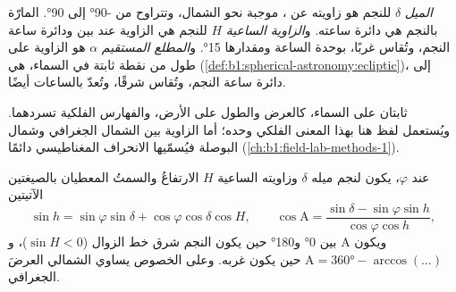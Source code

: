 \begin{definition}\label{def:b1:spherical-astronomy:equatorial}
\emph{الميل} $\delta$ للنجم هو زاويته عن ، موجبة نحو الشمال، وتتراوح من \ang{-90} إلى \ang{90}.  المارّة بالنجم  هي دائرة ساعته. و\emph{الزاوية الساعية} $H$ للنجم هي الزاوية عند  بين  ودائرة ساعة النجم، وتُقاس غربًا، بوحدة الساعة ومقدارها \ang{15}. و\emph{المطلع المستقيم} $\alpha$ هو الزاوية على طول  من نقطة ثابتة في السماء، هي  (\cref{def:b1:spherical-astronomy:ecliptic})، إلى دائرة ساعة النجم، وتُقاس شرقًا، وتُعدّ بالساعات أيضًا.
\end{definition}

 ثابتان على السماء، كالعرض والطول على الأرض، والفهارس الفلكية تسردهما. ويُستعمل لفظ  هنا بهذا المعنى الفلكي وحده؛ أما الزاوية بين الشمال الجغرافي وشمال البوصلة فيُسمّيها الانحراف المغناطيسي دائمًا (\cref{ch:b1:field-lab-methods-1}).

\begin{proposition}\label{prop:b1:spherical-astronomy:transform}
عند  $\varphi$، يكون لنجم ميله $\delta$ وزاويته الساعية $H$ الارتفاعُ والسمتُ المعطيان بالصيغتين الآتيتين
\[
  \sin h = \sin\varphi\sin\delta + \cos\varphi\cos\delta\cos H,
  \qquad
  \cos\mathrm{A} = \frac{\sin\delta - \sin\varphi\sin h}{\cos\varphi\cos h},
\]
ويكون $\mathrm{A}$ بين \ang{0} و\ang{180} حين يكون النجم شرق خط الزوال ($\sin H < 0$)، و$\mathrm{A} = \ang{360} - \arccos(\dots)$ حين يكون غربه. وعلى الخصوص يساوي  الشمالي العرضَ الجغرافي.
\end{proposition}

